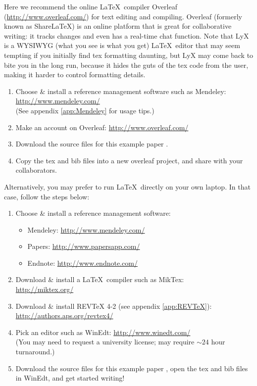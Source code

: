 \documentclass[aps,prb,twocolumn,superscriptaddress,floatfix,longbibliography]{revtex4-2}
\newif\ifptitle
\newif\ifpnumber
\newcounter{para}
\newcommand\ptitle[1]{\par\refstepcounter{para}
{\ifpnumber{\noindent\textcolor{lightgray}{\textbf{\thepara}}\indent}\fi}
{\ifptitle{\textbf{[{#1}]}}\fi}}
\begin{document}
\ptitle{Overleaf} Here we recommend the online \LaTeX\ compiler Overleaf (\url{http://www.overleaf.com/}) for text editing and compiling. Overleaf (formerly known as Share\LaTeX) is an online platform that is great for collaborative writing: it tracks changes and even has a real-time chat function. Note that LyX is a WYSIWYG (what you see is what you get) \LaTeX\ editor that may seem tempting if you initially find tex formatting daunting, but LyX may come back to bite you in the long run, because it hides the guts of the tex code from the user, making it harder to control formatting details.

\begin{raggedright}
\begin{enumerate}
\item Choose \& install a reference management software such as Mendeley:
\url{http://www.mendeley.com/}\\
(See appendix \ref{app:Mendeley} for usage tips.)
\item Make an account on Overleaf:
\url{http://www.overleaf.com/}\\
\item Download the source files for this example paper \cite{HoffmanExample}.
\item Copy the tex and bib files into a new overleaf project, and share with your collaborators.
\end{enumerate}
\end{raggedright}
\vspace{2mm}

\ptitle{Alternatives} Alternatively, you may prefer to run \LaTeX\ directly on your own laptop. In that case, follow the steps below:
\begin{raggedright}
\begin{enumerate}
\item Choose \& install a reference management software:
\begin{itemize}
\item Mendeley: \url{http://www.mendeley.com/}
\item Papers: \url{http://www.papersapp.com/}
\item Endnote: \url{http://www.endnote.com/}
\end{itemize}
\item Download \& install a \LaTeX\ compiler such as MikTex: \\
\url{http://miktex.org/}
\item Download \& install REVTeX 4-2 (see appendix \ref{app:REVTeX}):\\
\url{http://authors.aps.org/revtex4/}
\item Pick an editor such as WinEdt:
\url{http://www.winedt.com/}\\
(You may need to request a university license; may require $\sim 24$ hour turnaround.)
\item Download the source files for this example paper \cite{HoffmanExample}, open the tex and bib files in WinEdt, and get started writing!
\end{enumerate}
\end{raggedright}
\vspace{2mm}
\end{document}
